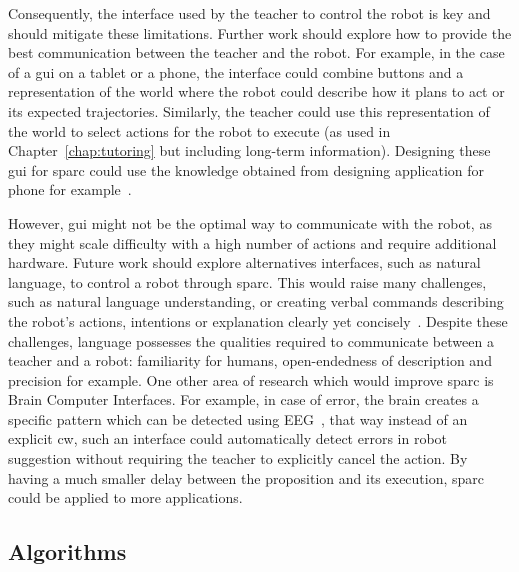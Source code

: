 Consequently, the interface used by the teacher to control the robot is key and should mitigate these limitations. Further work should explore how to provide the best communication between the teacher and the robot. For example, in the case of a \gls{gui} on a tablet or a phone, the interface could combine buttons and a representation of the world where the robot could describe how it plans to act or its expected trajectories. Similarly, the teacher could use this representation of the world to select actions for the robot to execute (as used in Chapter~\ref{chap:tutoring} but including long-term information). Designing these \gls{gui} for \gls{sparc} could use the knowledge obtained from designing application for phone for example~\citep{joorabchi2013real}. 

However, \gls{gui} might not be the optimal way to communicate with the robot, as they might scale difficulty with a high number of actions and require additional hardware. Future work should explore alternatives interfaces, such as natural language, to control a robot through \gls{sparc}. This would raise many challenges, such as natural language understanding, or creating verbal commands describing the robot's actions, intentions or explanation clearly yet concisely~\citep{hayes2017improving}. Despite these challenges, language possesses the qualities required to communicate between a teacher and a robot: familiarity for humans, open-endedness of description and precision for example. One other area of research which would improve \gls{sparc} is Brain Computer Interfaces. For example, in case of error, the brain creates a specific pattern which can be detected using EEG~\citep{gehring1993neural}, that way instead of an explicit \gls{cw}, such an interface could automatically detect errors in robot suggestion without requiring the teacher to explicitly cancel the action. By having a much smaller delay between the proposition and its execution, \gls{sparc} could be applied to more applications.

\subsection{Algorithms}

